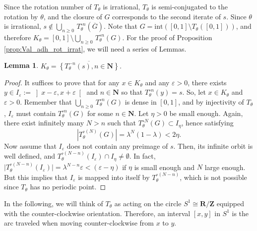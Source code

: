 \documentclass[11pt]{article}
\newtheorem{lemma}[thm]{Lemma}
\begin{document}
Since the rotation number of $T_{\theta}$ is irrational, $T_{\theta}$ is semi-conjugated to the rotation by $\theta$, and the closure of $G$ corresponds to the second iterate of $s$. Since $\theta$ is irrational, $s\notin\bigcup_{n\geq0}\,T_{\theta}^{\circ n}\left(\overline{G}\right)$. Note that $G=\text{int}\left(\left[0,1\right]\setminus T_{\theta}\left(\left[0,1\right]\right)\right)$, and therefore $K_{\theta}=\left[0,1\right]\setminus\bigcup_{n\geq0}\,T_{\theta}^{\circ n}\left(G\right)$. For the proof of Proposition \ref{prop:Val_adh_rot_irrat}, we will need a series of Lemmas.

\begin{lemma}
\label{lem:AdhK}
     $K_{\theta}=\overline{\left\{T_{\theta}^{-n}\left(s\right),n\in\mathbf{N}\right\}}$.
\end{lemma}

\begin{proof}
    It suffices to prove that for any $x\in K_{\theta}$ and any $\varepsilon>0$, there exists $y\in I_{\varepsilon}:=\left]x-\varepsilon,x+\varepsilon\right[$ and $n\in\mathbf{N}$ so that $T_{\theta}^{\circ n}\left(y\right)=s$. So, let $x\in K_{\theta}$ and $\varepsilon>0$. Remember that $\bigcup_{n\geq0}\,T_{\theta}^{\circ n}\left(G\right)$ is dense in $\left[0,1\right]$, and by injectivity of $T_{\theta}$, $I_{\varepsilon}$ must contain $T_{\theta}^{\circ n}\left(G\right)$ for some $n\in\mathbf{N}$. Let $\eta>0$ be small enough. Again, there exist infinitely many $N>n$ such that $T_{\theta}^{\circ N}\left(G\right)\subset I_{\eta}$, hence satisfying
    \begin{equation}
    \label{eq:sizeGeta}
        \left\lvert T_{\theta}^{\circ\left(N\right)}\left(G\right)\right\rvert=\lambda^{N}\left(1-\lambda\right)<2\eta.
    \end{equation}
    Now assume that $I_{\varepsilon}$ does not contain any preimage of $s$. Then, its infinite orbit is well defined, and $T_{\theta}^{\circ\left(N-n\right)}\left(I_{\varepsilon}\right)\cap I_{\eta}\neq\emptyset$. In fact, $\lvert T_{\theta}^{\circ\left(N-n\right)}\left(I_{\varepsilon}\right)\rvert=\lambda^{N-n}\varepsilon<\left(\varepsilon-\eta\right)$ if $\eta$ is small enough and $N$ large enough. But this implies that $I_{\varepsilon}$ is mapped into itself by $T_{\theta}^{\circ\left(N-n\right)}$, which is not possible since $T_{\theta}$ has no periodic point.
\end{proof}

In the following, we will think of $T_{\theta}$ as acting on the circle $S^{1}\cong\mathbf{R}/\mathbf{Z}$ equipped with the counter-clockwise orientation. Therefore, an interval $[x,y]$ in $S^{1}$ is the arc traveled when moving counter-clockwise from $x$ to $y$.
\end{document}
